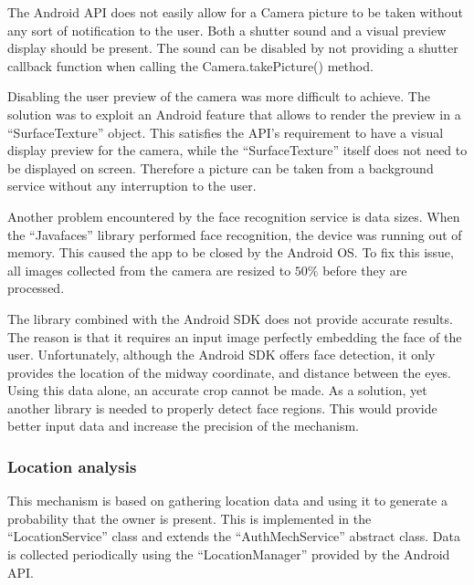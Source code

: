 The Android API does not easily allow for a Camera picture to be taken without any sort of notification to the user. Both a shutter sound and a visual preview display should be present. The sound can be disabled by not providing a shutter callback function when calling the Camera.takePicture() method. 

Disabling the user preview of the camera was more difficult to achieve. The solution was to exploit an Android feature that allows to render the preview in a ``SurfaceTexture'' object. This satisfies the API's requirement to have a visual display preview for the camera, while the ``SurfaceTexture'' itself does not need to be displayed on screen. Therefore a picture can be taken from a background service without any interruption to the user.

Another problem encountered by the face recognition service is data sizes. When the ``Javafaces'' library performed face recognition, the device was running out of memory. This caused the app to be closed by the Android OS. To fix this issue, all images collected from the camera are resized to $50\%$ before they are processed.

The library combined with the Android SDK does not provide accurate results. The reason is that it requires an input image perfectly embedding the face of the user. Unfortunately, although the Android SDK offers face detection, it only provides the location of the midway coordinate, and distance between the eyes. Using this data alone, an accurate crop cannot be made. As a solution, yet another library is needed to properly detect face regions. This would provide better input data and increase the precision of the mechanism.

\subsubsection{Location analysis}
This mechanism is based on gathering location data and using it to generate a probability that the owner is present. This is implemented in the ``LocationService'' class and extends the ``AuthMechService'' abstract class. Data is collected periodically using the ``LocationManager'' provided by the Android API.

